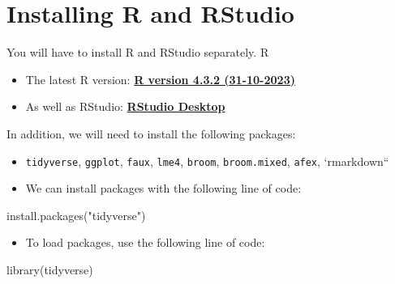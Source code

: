 \documentclass[
  letterpaper,
  DIV=11,
  numbers=noendperiod,
  oneside]{scrreprt}
\newenvironment{Shaded}{\begin{snugshade}}{\end{snugshade}}
\newcommand{\FunctionTok}[1]{\textcolor[rgb]{0.28,0.35,0.67}{#1}}
\newcommand{\NormalTok}[1]{\textcolor[rgb]{0.00,0.23,0.31}{#1}}
\newcommand{\StringTok}[1]{\textcolor[rgb]{0.13,0.47,0.30}{#1}}
\providecommand{\tightlist}{%
  \setlength{\itemsep}{0pt}\setlength{\parskip}{0pt}}\usepackage{longtable,booktabs,array}
\begin{document}

\hypertarget{installing-r-and-rstudio}{%
\chapter{Installing R and RStudio}\label{installing-r-and-rstudio}}

\hfill\break

You will have to install R and RStudio separately. R

\begin{itemize}
\item
  The latest R version: \href{https://cran.rstudio.com/}{\textbf{R
  version 4.3.2 (31-10-2023)}}
\item
  As well as RStudio:
  \href{https://posit.co/download/rstudio-desktop/}{\textbf{RStudio
  Desktop}}
\end{itemize}

In addition, we will need to install the following packages:

\begin{itemize}
\item
  \texttt{tidyverse}, \texttt{ggplot}, \texttt{faux}, \texttt{lme4},
  \texttt{broom}, \texttt{broom.mixed}, \texttt{afex}, `rmarkdown``
\item
  We can install packages with the following line of code:
\end{itemize}

\begin{Shaded}
\begin{Highlighting}[]
    \FunctionTok{install.packages}\NormalTok{(}\StringTok{"tidyverse"}\NormalTok{)}
\end{Highlighting}
\end{Shaded}

\begin{itemize}
\tightlist
\item
  To load packages, use the following line of code:
\end{itemize}

\begin{Shaded}
\begin{Highlighting}[]
    \FunctionTok{library}\NormalTok{(tidyverse)}
\end{Highlighting}
\end{Shaded}
\end{document}
